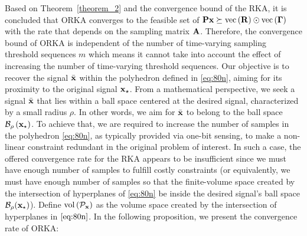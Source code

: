 \documentclass[12pt,draftcls,onecolumn]{IEEEtran}
\newcommand{\Fr}[1]{\textcolor{blue}{#1}}
\begin{document}
Based on Theorem~\ref{theorem_2} and the convergence bound of the RKA, it is concluded that ORKA converges to the feasible set of $\mathbf{P} \mathbf{x} \succeq \operatorname{vec}\left(\mathbf{R}\right)\odot \operatorname{vec}\left(\boldsymbol{\Gamma}\right)$ with the rate that depends on the sampling matrix $\mathbf{A}$. Therefore,
the convergence bound of
ORKA is independent of the number of time-varying sampling threshold sequences $m$ which means
it cannot take into account the effect of increasing the number of time-varying threshold sequences. 
Our objective is to recover the signal $\bar{\mathbf{x}}$ within the polyhedron defined in \eqref{eq:80n}, aiming for its proximity to the original signal $\mathbf{x}_{\star}$. From a mathematical perspective, we seek a signal $\bar{\mathbf{x}}$ that lies within a ball space centered at the desired signal, characterized by a small radius $\rho$. In other words, we aim for $\bar{\mathbf{x}}$ to belong to the ball space $\mathcal{B}_{\rho}\left(\mathbf{x}_{\star}\right)$. To achieve that,
we are required to increase the number of samples in the polyhedron \eqref{eq:80n}, as typically provided via one-bit sensing, to make a non-linear constraint redundant in the original problem of interest. %
In such a case, the offered convergence rate for the RKA appears to be insufficient since we must have enough number of samples to fulfill costly constraints (or equivalently, we must have enough number of samples so that the finite-volume space created by the intersection of hyperplanes of \eqref{eq:80n} be inside the desired signal's ball space $\mathcal{B}_{\rho}(\mathbf{x}_{\star})$). %
Define $\operatorname{vol}\left(\mathcal{P}_{\mathbf{x}}\right)$ as the volume space created by the intersection of hyperplanes in $\eqref{eq:80n}$. In the following proposition, we present the 
convergence rate of ORKA:

\end{document}
